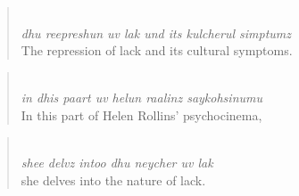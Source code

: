 \begin{quote}\noindent {}\\[1pt]
\textit{dhu reepreshun uv lak und its kulcherul simptumz}\\[1pt]
The repression of lack and its cultural symptoms.
\end{quote}
\begin{quote}\noindent {}\\[1pt]
\textit{in dhis paart uv helun raalinz saykohsinumu}\\[1pt]
In this part of Helen Rollins' psychocinema,
\end{quote}
\begin{quote}\noindent {}\\[1pt]
\textit{shee delvz intoo dhu neycher uv lak}\\[1pt]
she delves into the nature of lack.
\end{quote}